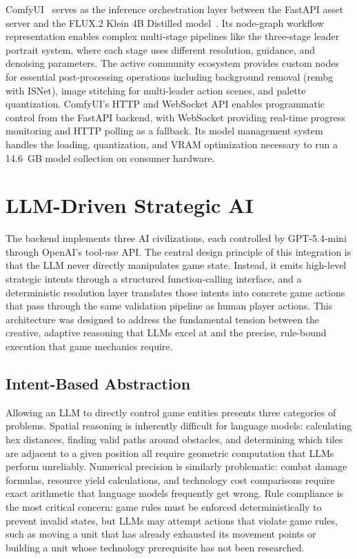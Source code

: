 \documentclass[conference]{IEEEtran}
\begin{document}
ComfyUI~\cite{comfyui2024} serves as the inference orchestration layer between the FastAPI asset server and the FLUX.2 Klein 4B Distilled model~\cite{blackforestlabs2024flux}. Its node-graph workflow representation enables complex multi-stage pipelines like the three-stage leader portrait system, where each stage uses different resolution, guidance, and denoising parameters. The active community ecosystem provides custom nodes for essential post-processing operations including background removal (rembg with ISNet), image stitching for multi-leader action scenes, and palette quantization. ComfyUI's HTTP and WebSocket API enables programmatic control from the FastAPI backend, with WebSocket providing real-time progress monitoring and HTTP polling as a fallback. Its model management system handles the loading, quantization, and VRAM optimization necessary to run a 14.6~GB model collection on consumer hardware.

\section{LLM-Driven Strategic AI}
\label{sec:llm}

The backend implements three AI civilizations, each controlled by GPT-5.4-mini through OpenAI's tool-use API. The central design principle of this integration is that the LLM never directly manipulates game state. Instead, it emits high-level strategic intents through a structured function-calling interface, and a deterministic resolution layer translates those intents into concrete game actions that pass through the same validation pipeline as human player actions. This architecture was designed to address the fundamental tension between the creative, adaptive reasoning that LLMs excel at and the precise, rule-bound execution that game mechanics require.

\subsection{Intent-Based Abstraction}

Allowing an LLM to directly control game entities presents three categories of problems. Spatial reasoning is inherently difficult for language models: calculating hex distances, finding valid paths around obstacles, and determining which tiles are adjacent to a given position all require geometric computation that LLMs perform unreliably. Numerical precision is similarly problematic: combat damage formulas, resource yield calculations, and technology cost comparisons require exact arithmetic that language models frequently get wrong. Rule compliance is the most critical concern: game rules must be enforced deterministically to prevent invalid states, but LLMs may attempt actions that violate game rules, such as moving a unit that has already exhausted its movement points or building a unit whose technology prerequisite has not been researched.
\end{document}
